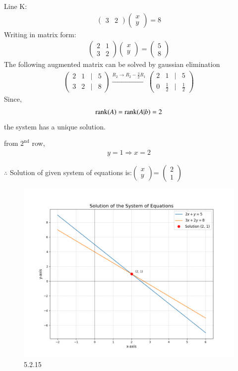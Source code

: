 \documentclass[journal]{IEEEtran}
\begin{document}
Line K:
\begin{align}
\begin{pmatrix}3 & 2\end{pmatrix}\begin{pmatrix}x \\y\end{pmatrix}= 8
\end{align}
Writing in matrix form:
\begin{align}
\begin{pmatrix}2 & 1 \\3 & 2\end{pmatrix}\begin{pmatrix}x \\y\end{pmatrix}=\begin{pmatrix}5 \\8\end{pmatrix}
\end{align}
The following augmented matrix can be solved by gaussian elimination
\begin{align}
\begin{pmatrix}2 & 1 & | & 5 \\3 & 2 & | & 8\end{pmatrix}\xrightarrow{R_2 \to R_2 - \frac{3}{2}R_1}\begin{pmatrix}2 & 1 & | & 5 \\0 & \frac{1}{2} & | & \frac{1}{2}\end{pmatrix}
\end{align}
Since,
\begin{align}
\text{rank}(A) = \text{rank}(A|b) = 2
\end{align}
the system has a unique solution.

from $2^{\text{nd}}$ row,
\begin{align}
y = 1 \Rightarrow x = 2
\end{align}

$\therefore$ Solution of given system of equations is:$\begin{pmatrix}x \\y\end{pmatrix}$= $\begin{pmatrix}2 \\1\end{pmatrix}$

\begin{figure}[H]
    \centering
    \includegraphics[width=0.85\columnwidth]{figs/graph10.png}
    \caption{5.2.15}
    \label{fig:placeholder}
\end{figure}
\end{document}
